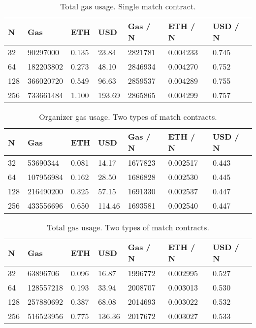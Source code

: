 \begin{table}[h]
\centering
\caption{Total gas usage. Single match contract.}
\label{tab:total-gas-usage-single}
\begin{tabular}{|l|l|l|l|l|l|l|}
\hline

N & Gas & ETH & USD & Gas / N & ETH / N & USD / N \\ \hline
32 & 90297000 & 0.135 & 23.84 & 2821781 & 0.004233 & 0.745 \\ \hline
64 & 182203802 & 0.273 & 48.10 & 2846934 & 0.004270 & 0.752 \\ \hline
128 & 366020720 & 0.549 & 96.63 & 2859537 & 0.004289 & 0.755 \\ \hline
256 & 733661484 & 1.100 & 193.69 & 2865865 & 0.004299 & 0.757 \\ \hline

\end{tabular}
\end{table}

\begin{table}[h]
\centering
\caption{Organizer gas usage. Two types of match contracts.}
\label{tab:org-gas-usage-dual}
\begin{tabular}{|l|l|l|l|l|l|l|}
\hline

N & Gas & ETH & USD & Gas / N & ETH / N & USD / N \\ \hline
32 & 53690344 & 0.081 & 14.17 & 1677823 & 0.002517 & 0.443 \\ \hline
64 & 107956984 & 0.162 & 28.50 & 1686828 & 0.002530 & 0.445 \\ \hline
128 & 216490200 & 0.325 & 57.15 & 1691330 & 0.002537 & 0.447 \\ \hline
256 & 433556696 & 0.650 & 114.46 & 1693581 & 0.002540 & 0.447 \\ \hline

\end{tabular}
\end{table}

\begin{table}[h]
\centering
\caption{Total gas usage. Two types of match contracts.}
\label{tab:total-gas-usage-dual}
\begin{tabular}{|l|l|l|l|l|l|l|}
\hline

N & Gas & ETH & USD & Gas / N & ETH / N & USD / N \\ \hline
32 & 63896706 & 0.096 & 16.87 & 1996772 & 0.002995 & 0.527 \\ \hline
64 & 128557218 & 0.193 & 33.94 & 2008707 & 0.003013 & 0.530 \\ \hline
128 & 257880692 & 0.387 & 68.08 & 2014693 & 0.003022 & 0.532 \\ \hline
256 & 516523956 & 0.775 & 136.36 & 2017672 & 0.003027 & 0.533 \\ \hline

\end{tabular}
\end{table}


